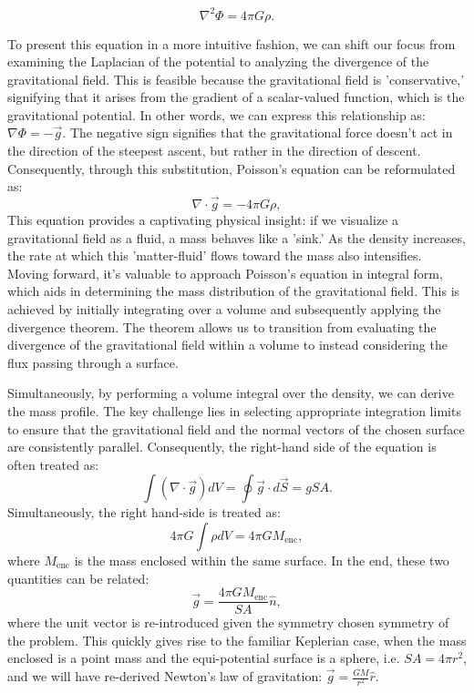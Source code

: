 \begin{equation}
    \nabla^2 \Phi = 4\pi G \rho.
\end{equation}

To present this equation in a more intuitive fashion, we can shift our focus from examining the Laplacian of the potential to analyzing the divergence of the gravitational field. This is feasible because the gravitational field is 'conservative,' signifying that it arises from the gradient of a scalar-valued function, which is the gravitational potential. In other words, we can express this relationship as: $\nabla \Phi = - \vec{g}$. The negative sign signifies that the gravitational force doesn't act in the direction of the steepest ascent, but rather in the direction of descent. Consequently, through this substitution, Poisson's equation can be reformulated as:
\begin{equation}
    \nabla \cdot \vec {g} = -4\pi G \rho,
\end{equation}
This equation provides a captivating physical insight: if we visualize a gravitational field as a fluid, a mass behaves like a 'sink.' As the density increases, the rate at which this 'matter-fluid' flows toward the mass also intensifies. Moving forward, it's valuable to approach Poisson's equation in integral form, which aids in determining the mass distribution of the gravitational field. This is achieved by initially integrating over a volume and subsequently applying the divergence theorem. The theorem allows us to transition from evaluating the divergence of the gravitational field within a volume to instead considering the flux passing through a surface.

Simultaneously, by performing a volume integral over the density, we can derive the mass profile. The key challenge lies in selecting appropriate integration limits to ensure that the gravitational field and the normal vectors of the chosen surface are consistently parallel. Consequently, the right-hand side of the equation is often treated as:
\begin{equation}
    \int \left(\nabla \cdot \vec{g} \right) dV = \oint \vec{g} \cdot d\vec{S} = g SA.
\end{equation}
Simultaneously, the right hand-side is treated as:
\begin{equation}
    4\pi G \int \rho dV = 4\pi G M_{\textrm{enc}},
\end{equation}
where $M_{\textrm{enc}}$ is the mass enclosed within the same surface. In the end, these two quantities can be related: 
\begin{equation}\label{EQ:force_from_enclosed_mass}
    \vec{g} = \frac{4\pi G M_{\textrm{enc}}}{SA} \hat{n},
\end{equation}
where the unit vector is re-introduced given the symmetry chosen symmetry of the problem. This quickly gives rise to the familiar Keplerian case, when the mass enclosed is a point mass and the equi-potential surface is a sphere, i.e. $SA=4\pi r^2$, and we will have re-derived Newton's law of gravitation: $    \vec{g} = \frac{G M}{r^2} \hat{r}$.


